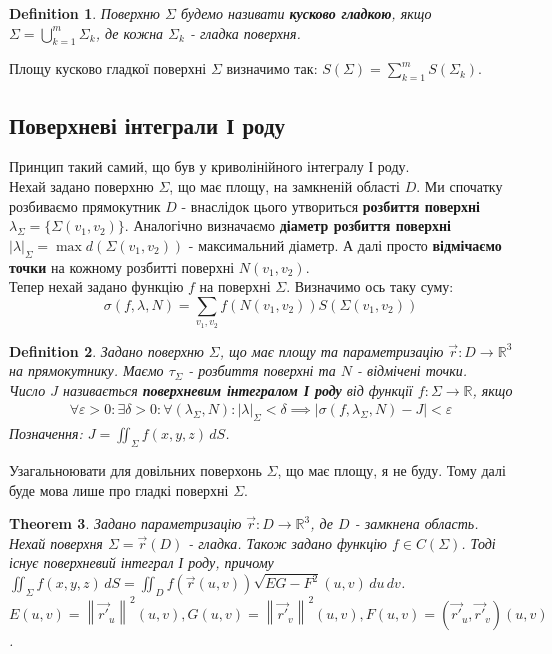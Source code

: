 \documentclass[a4paper, 10pt]{article}
\theoremstyle{theoremdd}
\newtheorem{theorem}{Theorem}[subsection]
\theoremstyle{theoremdd}
\newtheorem{definition}[theorem]{Definition}
\theoremstyle{theoremdd}
\theoremstyle{theoremdd}
\theoremstyle{theoremdd}
\theoremstyle{theoremdd}
\theoremstyle{theoremdd}
\theoremstyle{theoremdd}
\theoremstyle{theoremdd}
\theoremstyle{theoremdd}
\theoremstyle{theoremdd}
\theoremstyle{theoremdd}
\theoremstyle{theoremdd}
\theoremstyle{theoremdd}
\theoremstyle{theoremdd}
\newcommand\Norm[1]{\left\lVert#1\right\rVert}
\begin{document}
\begin{definition}
Поверхню $\Sigma$ будемо називати \textbf{кусково гладкою}, якщо $\Sigma = \displaystyle\bigcup_{k=1}^m \Sigma_k$, де кожна $\Sigma_k$ - гладка поверхня.
\end{definition}

Площу кусково гладкої поверхні $\Sigma$ визначимо так: $S(\Sigma) = \displaystyle\sum_{k=1}^m S(\Sigma_k)$.

\subsection{Поверхневі інтеграли І роду}
Принцип такий самий, що був у криволінійного інтегралу І роду.\\
Нехай задано поверхню $\Sigma$, що має площу, на замкненій області $D$. Ми спочатку розбиваємо прямокутник $D$ - внаслідок цього утвориться \textbf{розбиття поверхні} $\lambda_\Sigma = \{ \Sigma(v_1,v_2) \}$. Аналогічно визначаємо \textbf{діаметр розбиття поверхні} $|\lambda|_\Sigma = \max d(\Sigma(v_1,v_2))$ - максимальний діаметр. А далі просто \textbf{відмічаємо точки} на кожному розбитті поверхні $N(v_1,v_2)$.\\
Тепер нехай задано функцію $f$ на поверхні $\Sigma$. Визначимо ось таку суму:
$$ \sigma(f,\lambda,N) = \displaystyle\sum_{v_1,v_2} f(N(v_1,v_2)) S(\Sigma(v_1,v_2))$$

\begin{definition}
Задано поверхню $\Sigma$, що має площу та параметризацію $\vec{r}: D \to \mathbb{R}^3$ на прямокутнику. Маємо $\tau_\Sigma$ - розбиття поверхні та $N$ - відмічені точки.\\
Число $J$ називається \textbf{поверхневим інтегралом І роду} від функції $f: \Sigma \to \mathbb{R}$, якщо
\begin{align*}
\forall \varepsilon > 0: \exists \delta > 0: \forall (\lambda_\Sigma, N): |\lambda|_\Sigma < \delta \implies |\sigma(f,\lambda_\Sigma,N) - J| < \varepsilon
\end{align*}
Позначення: $J = \displaystyle\iint_\Sigma f(x,y,z)\,dS$.
\end{definition}

Узагальноювати для довільних поверхонь $\Sigma$, що має площу, я не буду. Тому далі буде мова лише про гладкі поверхні $\Sigma$.

\begin{theorem}
Задано параметризацію $\vec{r}: D \to \mathbb{R}^3$, де $D$ - замкнена область. Нехай поверхня $\Sigma = \vec{r}(D)$ - гладка. Також задано функцію $f \in C(\Sigma)$. Тоді існує поверхневий інтеграл І роду, причому\\
$\displaystyle\iint_\Sigma f(x,y,z)\,dS = \iint_D f(\vec{r}(u,v)) \sqrt{EG -F^2}(u,v)\,du\,dv$.\\
$E(u,v) = \Norm{\vec{r'}_u}^2(u,v), G(u,v) = \Norm{\vec{r'}_v}^2(u,v), F(u,v) = (\vec{r'}_u, \vec{r'}_v)(u,v)$.
\end{theorem}
\end{document}
